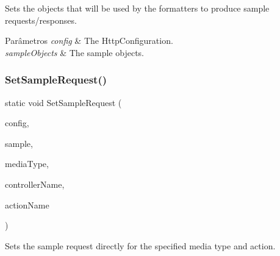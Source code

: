 Sets the objects that will be used by the formatters to produce sample requests/responses. 


\begin{DoxyParams}{Parâmetros}
{\em config} & The Http\+Configuration.\\
\hline
{\em sample\+Objects} & The sample objects.\\
\hline
\end{DoxyParams}
\mbox{\label{classApi3Layers_1_1Areas_1_1HelpPage_1_1HelpPageConfigurationExtensions_a82bd1788448158adaca5a19be618f630}} 
\subsubsection{\texorpdfstring{Set\+Sample\+Request()}{SetSampleRequest()}\hspace{0.1cm}{\footnotesize\ttfamily [1/2]}}
{\footnotesize\ttfamily static void Set\+Sample\+Request (\begin{DoxyParamCaption}\item[{this Http\+Configuration}]{config,  }\item[{object}]{sample,  }\item[{Media\+Type\+Header\+Value}]{media\+Type,  }\item[{string}]{controller\+Name,  }\item[{string}]{action\+Name }\end{DoxyParamCaption})\hspace{0.3cm}{\ttfamily [static]}}



Sets the sample request directly for the specified media type and action. 


